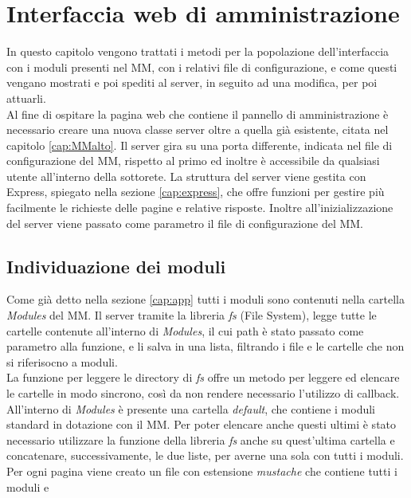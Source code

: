 \chapter{Interfaccia web di amministrazione}
In questo capitolo vengono trattati i metodi per la popolazione dell'interfaccia con i moduli
presenti nel MM, con i relativi file di configurazione, e come questi vengano mostrati e poi spediti
al server, in seguito ad una modifica, per poi attuarli.\\[1\baselineskip]
Al fine di ospitare la pagina web che contiene il pannello di amministrazione è necessario
creare una nuova classe server oltre a quella già esistente, citata nel capitolo \ref{cap:MMalto}.
Il server gira su una porta differente, indicata nel file di configurazione del MM, rispetto al primo
ed inoltre è accessibile da qualsiasi utente all'interno della sottorete.
La struttura del server viene gestita con Express, spiegato nella sezione \ref{cap:express}, che offre funzioni per gestire
più facilmente le richieste delle pagine e relative risposte.
Inoltre all'inizializzazione del server viene passato come parametro il file di configurazione del
MM.

\section{Individuazione dei moduli}
Come già detto nella sezione \ref{cap:app} tutti i moduli sono contenuti nella
cartella \textit{Modules} del MM. Il server tramite la libreria \textit{fs} (File System),
legge tutte le cartelle contenute all'interno di \textit{Modules}, il cui path è stato passato
come parametro alla funzione, e li salva
in una lista, filtrando i file e le cartelle che non si riferisocno a moduli.\\
La funzione per leggere le directory di \textit{fs} offre un metodo per leggere ed elencare le cartelle in
modo sincrono, così da non rendere necessario l'utilizzo di callback.
All'interno di \textit{Modules} è presente una cartella \textit{default}, che contiene
i moduli standard in dotazione con il MM. Per poter elencare anche questi ultimi è stato necessario utilizzare la funzione
della libreria \textit{fs} anche su quest'ultima cartella e concatenare, successivamente, le due liste,
per averne una sola con tutti i moduli.\\
Per ogni pagina viene creato un file con estensione \textit{mustache} che contiene tutti i moduli e 
